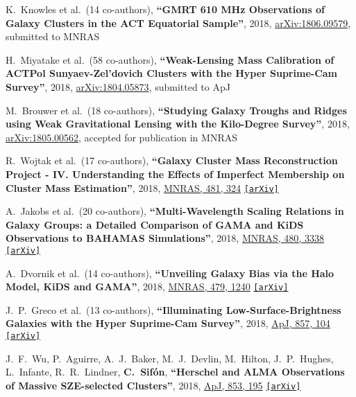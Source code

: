 \documentclass{article}
\def\apj{ApJ}
\def\mnras{MNRAS}
\newcommand{\myself}{\textbf{\color{red} C.~Sif\'on}}
\newcommand{\accepted}[1]{accepted for publication in #1}
\newcommand{\etal}[1]{et al.\ (#1 co-authors),}
\newcommand{\paper}[1]{\textbf{``#1''}}
\newcommand{\submitted}[1]{submitted to #1}
\newcommand{\arxiv}[1]
    {\href{https://arxiv.org/abs/#1}{\texttt{\color{magenta}[arXiv]}}}
\begin{document}
\begin{etaremune}


\item
K.~Knowles \etal{14}
\paper{GMRT 610 MHz Observations of Galaxy Clusters in the ACT Equatorial Sample},
2018, \href{http://adsabs.harvard.edu/abs/2018arXiv180609579K}{arXiv:1806.09579},
\submitted{\mnras}

\item
H.~Miyatake \etal{58}
\paper{Weak-Lensing Mass Calibration of ACTPol Sunyaev-Zel'dovich Clusters with the Hyper Suprime-Cam Survey},
2018, \href{http://adsabs.harvard.edu/abs/2018arXiv180405873M}{arXiv:1804.05873},
\submitted{\apj}



\item
M.~Brouwer \etal{18}
\paper{Studying Galaxy Troughs and Ridges using Weak Gravitational Lensing with the Kilo-Degree Survey},
2018, \href{http://adsabs.harvard.edu/abs/2018arXiv180500562B}{arXiv:1805.00562},
\accepted{\mnras}



\item
R.~Wojtak \etal{17}
\paper{Galaxy Cluster Mass Reconstruction Project - IV. Understanding the Effects of Imperfect Membership on Cluster Mass Estimation},
2018, \href{http://adsabs.harvard.edu/abs/2018MNRAS.481..324W}{\mnras, 481, 324}
\arxiv{1806.03199}

\item
A.~Jakobs \etal{20}
\paper{Multi-Wavelength Scaling Relations in Galaxy Groups: a Detailed Comparison of GAMA and KiDS Observations to BAHAMAS Simulations},
2018, \href{http://adsabs.harvard.edu/abs/2018MNRAS.480.3338J}{\mnras, 480, 3338}
\arxiv{1712.05463}

\item
A.~Dvornik \etal{14}
\paper{Unveiling Galaxy Bias via the Halo Model, KiDS and GAMA},
2018, \href{http://adsabs.harvard.edu/abs/2018MNRAS.479.1240D}{\mnras, 479, 1240}
\arxiv{1802.00734}

\item
J.~P.~Greco \etal{13}
\paper{Illuminating Low-Surface-Brightness Galaxies with the Hyper Suprime-Cam 
Survey},
2018, \href{http://adsabs.harvard.edu/abs/2018ApJ...857..104G}{\apj, 857, 104}
\arxiv{1709.04474}

\item
J.~F.~Wu, P.~Aguirre, A.~J.~Baker, M.~J.~Devlin, M.~Hilton, J.~P.~Hughes,
L.~Infante, R.~R.~Lindner, \myself,
\paper{Herschel and ALMA Observations of Massive SZE-selected Clusters},
2018, \href{http://adsabs.harvard.edu/abs/2018ApJ...853..195W}{\apj, 853, 195}
\arxiv{1712.04540}


\end{etaremune}
\end{document}
